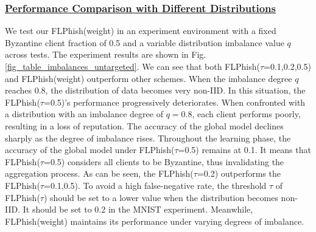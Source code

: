 \documentclass[lettersize,journal]{IEEEtran}
\begin{document}
    \subsubsection{\ul{Performance Comparison with Different Distributions}} We test our FLPhish(weight) in an experiment environment with a fixed Byzantine client fraction of 0.5 and a variable distribution imbalance value $q$ across tests. The experiment results are shown in Fig. \ref{fig_table_imbalances_untargeted}. We can see that both FLPhish($\tau$=0.1,0.2,0.5) and FLPhish(weight) outperform other schemes. When the imbalance degree $q$ reaches 0.8, the distribution of data becomes very non-IID. In this situation, the FLPhish($\tau$=0.5)'s performance progressively deteriorates. When confronted with a distribution with an imbalance degree of $q=0.8$, each client performs poorly, resulting in a loss of reputation. The accuracy of the global model declines sharply as the degree of imbalance rises. Throughout the learning phase, the accuracy of the global model under FLPhish($\tau$=0.5) remains at 0.1. It means that FLPhish($\tau$=0.5) considers all clients to be Byzantine, thus invalidating the aggregation process. As can be seen, the FLPhish($\tau$=0.2) outperforms the FLPhish($\tau$=0.1,0.5). To avoid a high false-negative rate, the threshold $\tau$ of FLPhish($\tau$) should be set to a lower value when the distribution becomes non-IID. It should be set to 0.2 in the MNIST experiment. Meanwhile, FLPhish(weight) maintains its performance under varying degrees of imbalance.
    


    
\end{document}
